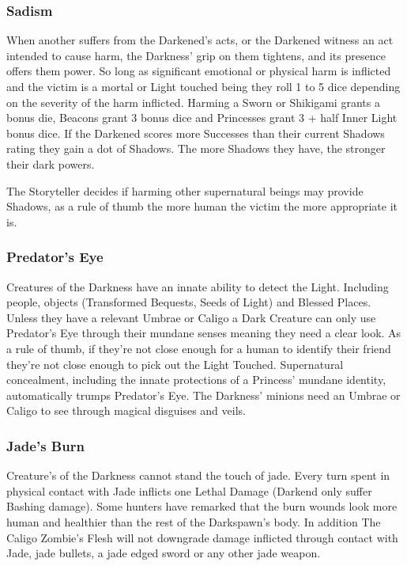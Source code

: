 \subsubsection*{Sadism}
When another suffers from the Darkened's acts, or the Darkened witness an act intended to cause harm, the Darkness' grip on them tightens, and its presence offers them power. So long as significant emotional or physical harm is inflicted and the victim is a mortal or Light touched being they roll 1 to 5 dice depending on the severity of the harm inflicted. Harming a Sworn or Shikigami grants a bonus die, Beacons grant 3 bonus dice and Princesses grant 3 + half Inner Light bonus dice. If the Darkened scores more Successes than their current Shadows rating they gain a dot of Shadows. The more Shadows they have, the stronger their dark powers.  

The Storyteller decides if harming other supernatural beings may provide Shadows, as a rule of thumb the more human the victim the more appropriate it is. 

\subsubsection*{Predator's Eye}
Creatures of the Darkness have an innate ability to detect the Light. Including people, objects (Transformed Bequests, Seeds of Light) and Blessed Places. Unless they have a relevant Umbrae or Caligo a Dark Creature can only use Predator's Eye through their mundane senses meaning they need a clear look. As a rule of thumb, if they're not close enough for a human to identify their friend they're not close enough to pick out the Light Touched. Supernatural concealment, including the innate protections of a Princess' mundane identity, automatically trumps Predator's Eye. The Darkness' minions need an Umbrae or Caligo to see through magical disguises and veils.

\subsubsection*{Jade's Burn}
Creature's of the Darkness cannot stand the touch of jade. Every turn spent in physical contact with Jade inflicts one Lethal Damage (Darkend only suffer Bashing damage). Some hunters have remarked that the burn wounds look more human and healthier than the rest of the Darkspawn's body. In addition The Caligo Zombie's Flesh will not downgrade damage inflicted through contact with Jade, jade bullets, a jade edged sword or any other jade weapon. 

